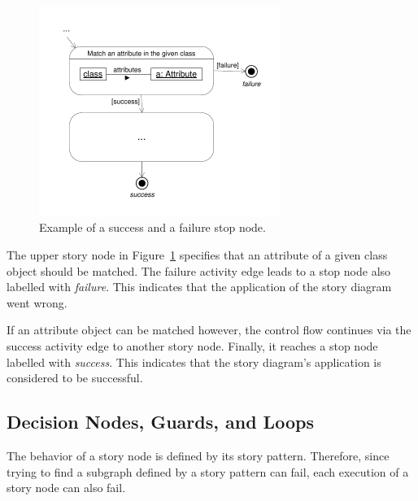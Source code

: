\begin{figure}[htb]
\begin{center}
  \includegraphics[width=0.7\textwidth]{figures/SuccessAndFailureStopNodes}
  \caption{Example of a success and a failure stop node.}
  \label{fig:successAndFailureStopNodes}
\end{center}
\end{figure}

The upper story node in Figure~\ref{fig:successAndFailureStopNodes} specifies that an attribute of a given class object should be matched.
The failure activity edge leads to a stop node also labelled with \emph{failure}.
This indicates that the application of the story diagram went wrong.

If an attribute object can be matched however, the control flow continues via the success activity edge to another story node.
Finally, it reaches a stop node labelled with \emph{success}.
This indicates that the story diagram's application is considered to be successful.


\subsection{Decision Nodes, Guards, and Loops}
\label{sec:DecisionNodesEtc}

The behavior of a story node is defined by its story pattern.
Therefore,
since trying to find a subgraph defined by a story pattern can fail,
each execution of a story node can also fail.


